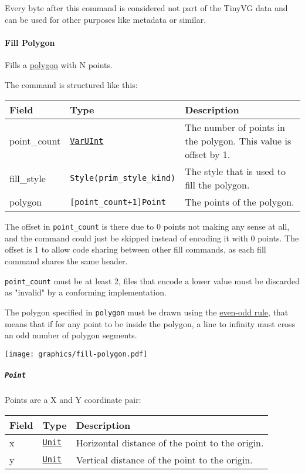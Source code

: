 \documentclass[]{article}
\begin{document}
Every byte after this command is considered not part of the TinyVG data
and can be used for other purposes like metadata or similar.

\hypertarget{fill-polygon}{\paragraph{Fill Polygon}\label{fill-polygon}}

Fills a \href{https://en.wikipedia.org/wiki/Polygon}{polygon} with N points.

The command is structured like this:

\begin{longtable}[]{@{}p{1in}p{2in}p{3in}@{}}
\toprule
Field & Type & Description \\
\midrule
\endhead
point\_count & \protect\hyperlink{varuint}{\texttt{VarUInt}} & The
number of points in the polygon. This value is offset by 1. \\
fill\_style & \texttt{Style(prim\_style\_kind)} & The style that is
used to fill the polygon.\\
polygon & \texttt{{[}point\_count+1{]}Point} & The points of the
polygon. \\
\bottomrule
\end{longtable}

The offset in \texttt{point\_count} is there due to 0 points not making
any sense at all, and the command could just be skipped instead of encoding
it with 0 points. The offset is 1 to allow code sharing between other
fill commands, as each fill command shares the same header.

\texttt{point\_count} must be at least 2, files that encode a lower
value must be discarded as "invalid" by a conforming implementation.

The polygon specified in \texttt{polygon} must be drawn using the
\href{https://en.wikipedia.org/wiki/Even\%E2\%80\%93odd_rule}{even-odd
rule}, that means that if for any point to be inside the polygon, a line
to infinity must cross an odd number of polygon segments.

\begin{center}
\texttt{[image: graphics/fill-polygon.pdf]}
\end{center}

\hypertarget{point}{\subparagraph{\texorpdfstring{\texttt{Point}}{Point}}\label{point}}

Points are a X and Y coordinate pair:

\begin{longtable}[]{@{}p{1in}p{1in}p{4in}@{}}
\toprule
Field & Type & Description \\
\midrule
\endhead
x & \protect\hyperlink{units}{\texttt{Unit}} & Horizontal distance of the point to the origin. \\
y & \protect\hyperlink{units}{\texttt{Unit}} & Vertical distance of the point to the origin. \\
\bottomrule
\end{longtable}
\end{document}
